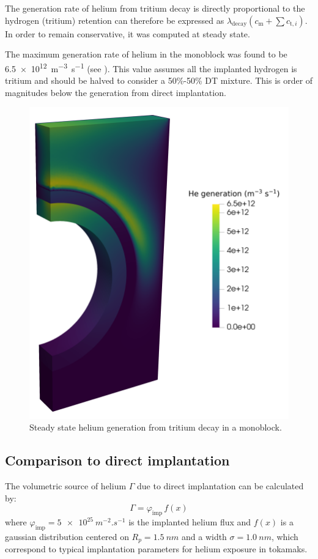The generation rate of helium from tritium decay is directly proportional to the hydrogen (tritium) retention can therefore be expressed as $\lambda_\mathrm{decay} (c_\mathrm{m} + \sum c_{\mathrm{t}, i})$.
In order to remain conservative, it was computed at steady state.

The maximum generation rate of helium in the \gls{monoblock} was found to be \SI{6.5e12}{m^{-3}.s^{-1}} (see ).
This value assumes all the implanted hydrogen is tritium and should be halved to consider a 50\%-50\% DT mixture.
This is order of magnitudes below the generation from direct implantation.

\begin{figure}
    \centering
    \includegraphics[width=0.5\linewidth]{Figures/Chapter5/he_generation_decay.png}
    \caption{Steady state helium generation from tritium decay in a monoblock.}
\end{figure}

\subsection{Comparison to direct implantation}

The volumetric source of helium $\Gamma$ due to direct implantation can be calculated by:
\begin{equation}
    \Gamma = \varphi_\mathrm{imp} \, f(x)
\end{equation}
where $\varphi_\mathrm{imp} = \SI{5e25}{m^{-2}.s^{-1}}$ is the implanted helium flux and $f(x)$ is a gaussian distribution centered on $R_p=\SI{1.5}{nm}$ and a width $\sigma=\SI{1.0}{nm}$, which correspond to typical implantation parameters for helium exposure in tokamaks.

